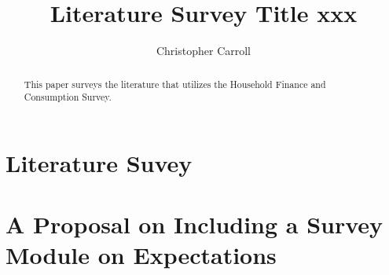 \documentclass[]{article}
\title{Literature Survey Title xxx}
\author{Christopher Carroll}
\begin{document}
\maketitle

\begin{abstract}
This paper surveys the literature that utilizes the Household Finance and Consumption Survey. 
\end{abstract}

\section{Literature Suvey}

\section{A Proposal on Including a Survey Module on Expectations}





\end{document}
